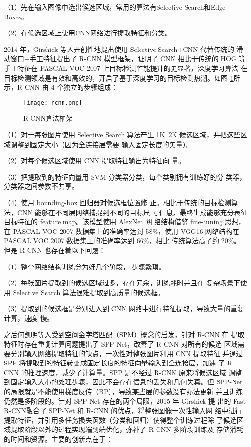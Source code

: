 （1）先在输入图像中选出候选区域。常用的算法有Selective Search和Edge Boxes。

（2）在候选区域上使用CNN网络进行提取特征和分类。

2014 年，Girshick 等人开创性地提出使用 Selective Search+CNN 代替传统的
滑动窗口+手工特征提出了 R-CNN 模型框架\cite{girshick2014rich}，证明了 CNN 相比于传统的 HOG
等手工特征在 PASCAL VOC 2007 上目标检测性能提升的更显著，深度学习算法
在目标检测领域是有效和高效的，开启了基于深度学习的目标检测热潮。如图
\ref{rcnn}所示，R-CNN 由 4 个独立的步骤组成：

\begin{figure}[htbp]
    \centering
    \texttt{[image: rcnn.png]}
    \caption{R-CNN算法框架}
    \label{rcnn}
\end{figure}

（1）对于每张图片使用 Selective Search
算法产生 1K~2K 候选区域，并把这些区域调整到固定大小（因为全连接层需要
输入固定长度的矢量）。

（2）对每个候选区域使用 CNN 提取特征输出为特征向
量。

（3）把提取到的特征向量用 SVM 分类器分类，每个类别拥有训练好的分
类器，分类器之间参数不共享。

（4）使用 bounding-box 回归器对候选框位置修
正。相比于传统的目标检测算法，CNN 能够在不同层网络捕捉到不同的目标尺
寸信息，最终生成能够充分表征目标特征的 feature map。该模型使用 AlexNet 网
络结构借鉴 fine-tuning 思想，在 PASCAL VOC 2007 数据集上的准确率达到 58$\%$，使用 VGG16 网络结构在 PASCAL VOC 2007 数据集上的准确率达到 66$\%$，相比
传统算法高了约 20$\%$。
但是 R-CNN 也存在着以下问题：

（1）整个网络结构训练分为好几个阶段，
步骤繁琐。

（2）每张图片提取到的候选区域过多，存在冗余，训练耗时并且在
复杂场景下使用 Selective Search 算法很难提取到高质量的候选框。

（3）提取到的候选框是分别进入到 CNN 网络中进行特征提取，导致大量的重复计算，速度
慢。

之后何凯明等人受到空间金字塔匹配（SPM）概念的启发，针对 R-CNN 在
提取特征时存在重复计算问题提出了 SPP-Net\cite{purkait2017spp}，改善了 R-CNN 对所有的候选
区域需要分别输入网络提取特征的缺点，一次性对整张图片利用 CNN 提取特征
并通过 SPP 将提取到的特征转变成固定长度的特征向量输入到全连接层，加速
了 R-CNN 的推理速度，减少了计算量。SPP 是不经过 R-CNN 原来将候选区域
调整到固定输入大小的处理步骤，因此不会存在信息的丢失和几何失真。但
SPP-Net 的局限就是不能使用梯度反传（BP），导致某些层的参数没有办法更新
并且训练仍然是多阶段的。针对 SPP-Net 存在的两个局限，2015 年 Girshick 提
出的 Fast R-CNN\cite{girshick2015fast}融合了 SPP-Net 和 R-CNN 的优点，将整张图像一次性输入网
络中进行提取特征，并引用多任务损失函数（分类和回归）使得整个训练过程除
了候选区域提取阶段以外的过程实现端到端优化，弥补了 R-CNN 多阶段训练及
存储消耗的时间和资源。主要的创新点在于：

